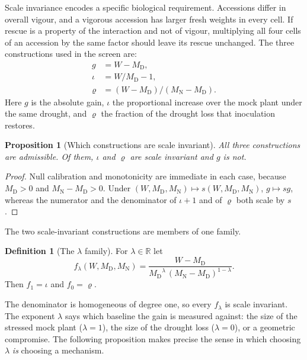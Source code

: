 \documentclass[10pt,twocolumn,a4paper]{article}
\newtheorem{proposition}{Proposition}[section]
\theoremstyle{definition}
\newtheorem{definition}{Definition}[section]
\theoremstyle{remark}
\newcommand{\MD}{{M_{\mathrm D}}}
\newcommand{\MN}{{M_{\mathrm N}}}
\newcommand{\WD}{W}
\newcommand{\gainf}{g}
\newcommand{\incf}{\iota}
\newcommand{\resf}{\varrho}
\newcommand{\flam}{f_{\lambda}}
\newcommand{\Rset}{\mathbb{R}}
\begin{document}
Scale invariance encodes a specific biological requirement. Accessions
differ in overall vigour, and a vigorous accession has larger fresh
weights in every cell. If rescue is a property of the interaction and not
of vigour, multiplying all four cells of an accession by the same factor
should leave its rescue unchanged. The three constructions used in the
screen are:
\begin{align}
  \gainf &= \WD-\MD, \label{eq:gain}\\
  \incf  &= \WD/\MD-1, \label{eq:inc}\\
  \resf  &= (\WD-\MD)/(\MN-\MD). \label{eq:res}
\end{align}
Here $\gainf$ is the absolute gain, $\incf$ the proportional increase
over the mock plant under the same drought, and $\resf$ the fraction of
the drought loss that inoculation restores.

\begin{proposition}[Which constructions are scale invariant]
\label{prop:scale}
All three constructions are admissible. Of them, $\incf$ and $\resf$ are
scale invariant and $\gainf$ is not.
\end{proposition}
\begin{proof}
Null calibration and monotonicity are immediate in each case, because
$\MD>0$ and $\MN-\MD>0$. Under $(\WD,\MD,\MN)\mapsto s(\WD,\MD,\MN)$,
$\gainf\mapsto s\gainf$, whereas the numerator and the denominator of
$\incf+1$ and of $\resf$ both scale by $s$.
\end{proof}

The two scale-invariant constructions are members of one family.

\begin{definition}[The $\lambda$ family]
\label{def:lambda}
For $\lambda\in\Rset$ let
\begin{equation}
  \flam(\WD,\MD,\MN)=\frac{\WD-\MD}{\MD^{\lambda}\,(\MN-\MD)^{1-\lambda}}.
  \label{eq:flam}
\end{equation}
Then $f_1=\incf$ and $f_0=\resf$.
\end{definition}

The denominator is homogeneous of degree one, so every $\flam$ is scale
invariant. The exponent $\lambda$ says which baseline the gain is
measured against: the size of the stressed mock plant ($\lambda=1$), the
size of the drought loss ($\lambda=0$), or a geometric compromise. The
following proposition makes precise the sense in which choosing $\lambda$
\emph{is} choosing a mechanism.
\end{document}
